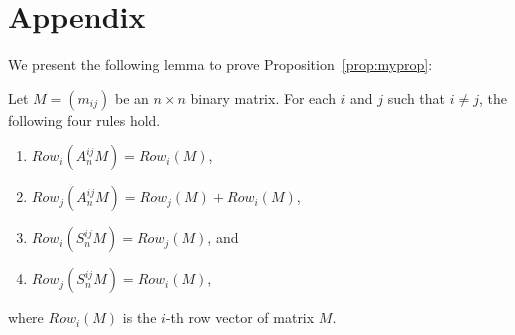 \section*{Appendix}
We present the following lemma to prove Proposition~\ref{prop:myprop}:
\begin{lemma}
	Let $ M=(m_{ij}) $ be an $ n\times n $ binary matrix. For each $ i $ and $ j $ such that $ i\neq j $, the following four rules hold.
	\begin{enumerate}[label=(\roman*)]
		\item $ Row_i (A_n^{ij} M)=Row_i (M) $,
		\item $ Row_j (A_n^{ij} M)=Row_j (M)+Row_i (M) $,
		\item $ Row_i (S_n^{ij} M)=Row_j (M) $, and
		\item $ Row_j (S_n^{ij} M)=Row_i (M) $,
	\end{enumerate}
	where $ Row_i (M) $ is the $ i $-th row vector of matrix $ M $.
\end{lemma}
